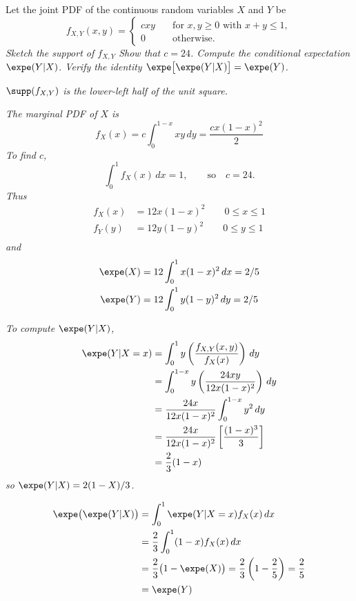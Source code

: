 \begin{example}
Let the joint PDF of the continuous random variables $X$ and $Y$ be 
\[
f_{X,Y}(x,y) = \begin{cases}
	cxy & \quad\text{for $x,y\geq 0$ with $x+y\leq 1$}, \\
	0	& \quad\text{otherwise.}
\end{cases}
\]
\ben
\it Sketch the support of $f_{X,Y}$
\it Show that $c=24$.
\it Compute the conditional expectation $\expe(Y|X)$.
\it Verify the identity $\expe\big[\expe(Y|X)\big]=\expe(Y)$.
\een 

\begin{solution}
\ben

\it %
$\supp(f_{X,Y})$ is the lower-left half of the unit square.

\it %
The marginal PDF of $X$ is
\[
f_X(x) = c\int_{0}^{1-x} xy\,dy = \frac{cx(1-x)^2}{2}
\]
To find $c$,
\[
\int_{0}^{1} f_X(x)\,dx = 1, \qquad\text{so}\quad c=24.
\]
Thus
\begin{align*}
f_X(x)	& = 12x(1-x)^2 \qquad 0\leq x\leq 1 \\
f_Y(y)	& = 12y(1-y)^2 \qquad 0\leq y\leq 1 \\
\end{align*}
and
\begin{align*}
\expe(X) & = 12\int_0^1 x(1-x)^2\,dx = 2/5 \\
\expe(Y) & = 12\int_0^1 y(1-y)^2\,dy = 2/5 \\
\end{align*}

\it %
To compute $\expe(Y|X)$,
\begin{align*}
\expe(Y|X=x)
	& = \int_0^1 y\left(\frac{f_{X,Y}(x,y)}{f_X(x)}\right)\,dy \\
	& = \int_0^{1-x} y\left(\frac{24xy}{12x(1-x)^2}\right)\,dy \\
	& = \frac{24x}{12x(1-x)^2}\int_0^{1-x} y^2\,dy \\
	& =  \frac{24x}{12x(1-x)^2}\left[\frac{(1-x)^3}{3}\right] \\
	& = \frac{2}{3}(1-x)	
\end{align*}
so $\expe(Y|X) = 2(1-X)/3$.

\it %
\begin{align*}
\expe\big(\expe(Y|X)\big)
	& = \int_0^1 \expe(Y|X=x) f_X(x)\,dx \\
	& = \frac{2}{3}\int_0^1 (1-x) f_X(x)\,dx \\
	& = \frac{2}{3}\big(1-\expe(X)\big) = \frac{2}{3}\left(1-\frac{2}{5}\right) = \frac{2}{5} \\
	& = \expe(Y)
\end{align*}
\een
\mbox{}
\end{solution}
\end{example}


